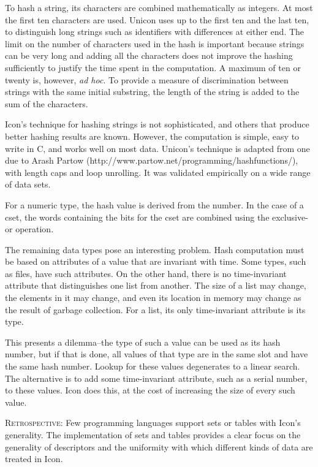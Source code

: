 To hash a string, its characters are combined mathematically as
integers. At most the first ten characters are used. {\color{blue}
Unicon uses up to the first ten and the last ten, to distinguish
long strings such as identifiers with differences at either end}.
The limit on the number of characters used in the hash is important
because strings can be very long and adding all the characters does
not improve the hashing sufficiently to justify the time spent in the
computation. A maximum of ten or twenty is, however, \textit{ad hoc}. To
provide a measure of discrimination between strings with the same
initial substring, the length of the string is added to the sum of the
characters.

Icon's technique for hashing strings is not sophisticated, and others
that produce better hashing results are known. However, the
computation is simple, easy to write in C, and works well on most data.
Unicon's technique is adapted from one due to Arash Partow
(http://www.partow.net/programming/hashfunctions/), with length
caps and loop unrolling.  It was validated empirically on a wide
range of data sets.

For a numeric type, the hash value is derived from the number. In the
case of a cset, the words containing the bits for the cset are
combined using the exclusive-or operation.

The remaining data types pose an interesting problem. Hash computation
must be based on attributes of a value that are invariant with
time. Some types, such as files, have such attributes. On the other
hand, there is no time-invariant attribute that distinguishes one list
from another. The size of a list may change, the elements in it may
change, and even its location in memory may change as the result of
garbage collection. For a list, its only time-invariant attribute is
its type.

This presents a dilemma--the type of such a value can be used as its
hash number, but if that is done, all values of that type are in the
same slot and have the same hash number. Lookup for these values
degenerates to a linear search.  The alternative is to add some
time-invariant attribute, such as a serial number, to these
values. Icon does this, at the cost of increasing the size of every
such value.

\textsc{Retrospective}: Few programming languages support sets or
tables with Icon's generality. The implementation of sets and tables
provides a clear focus on the generality of descriptors and the
uniformity with which different kinds of data are treated in Icon.

